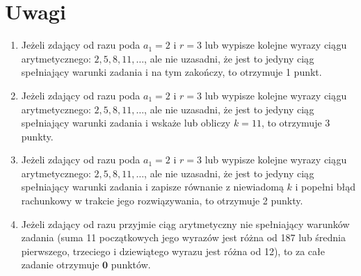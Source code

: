 \documentclass[10pt]{article}
\begin{document}
\section*{Uwagi}
\begin{enumerate}
  \item Jeżeli zdający od razu poda $a_{1}=2$ i $r=3$ lub wypisze kolejne wyrazy ciągu arytmetycznego: $2,5,8,11, \ldots$, ale nie uzasadni, że jest to jedyny ciąg spełniający warunki zadania i na tym zakończy, to otrzymuje 1 punkt.
  \item Jeżeli zdający od razu poda $a_{1}=2$ i $r=3$ lub wypisze kolejne wyrazy ciągu arytmetycznego: $2,5,8,11, \ldots$, ale nie uzasadni, że jest to jedyny ciąg spełniający warunki zadania i wskaże lub obliczy $k=11$, to otrzymuje 3 punkty.
  \item Jeżeli zdający od razu poda $a_{1}=2$ i $r=3$ lub wypisze kolejne wyrazy ciągu arytmetycznego: $2,5,8,11, \ldots$, ale nie uzasadni, że jest to jedyny ciąg spełniający warunki zadania i zapisze równanie z niewiadomą $k$ i popełni błąd rachunkowy w trakcie jego rozwiązywania, to otrzymuje 2 punkty.
  \item Jeżeli zdający od razu przyjmie ciąg arytmetyczny nie spełniający warunków zadania (suma 11 początkowych jego wyrazów jest różna od 187 lub średnia pierwszego, trzeciego i dziewiątego wyrazu jest różna od 12), to za całe zadanie otrzymuje $\mathbf{0}$ punktów.
\end{enumerate}
\end{document}
